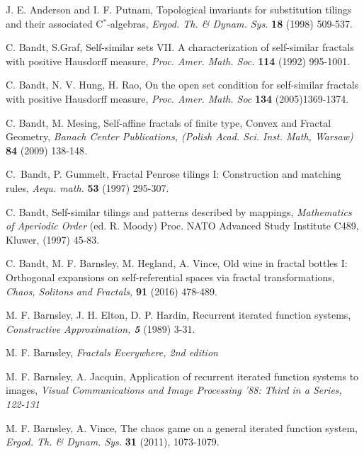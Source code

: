 \documentclass{amsproc}
\theoremstyle{plain}
\theoremstyle{definition}
\numberwithin{equation}{section}
\begin{document}
\begin{thebibliography}{99}
 J. E. Anderson and I. F. Putnam, Topological invariants
for substitution tilings and their associated C$^{\ast}$-algebras, \textit{%
Ergod. Th. \& Dynam. Sys. }\textbf{18 }(1998) 509-537.

\begin{newrigid}

C. Bandt, S.Graf, Self-similar sets VII. A
characterization of self-similar fractals with positive Hausdorff measure,
\textit{Proc. Amer. Math. Soc. }\textbf{114} (1992) 995-1001.

C. Bandt, N. V. Hung, H. Rao, On the open set
condition for self-similar fractals with positive Hausdorff measure,
\textit{Proc. Amer. Math. Soc }\textbf{134 }(2005)1369-1374.

C. Bandt, M. Mesing, Self-affine fractals of finite
type, Convex and Fractal Geometry,\textit{ Banach Center Publications, (Polish
Acad. Sci. Inst. Math, Warsaw) }\textbf{84} (2009)\textit{ }138-148\textit{.}

\end{newrigid}

 C.\ Bandt, P. Gummelt, Fractal Penrose tilings I:
Construction and matching rules, \textit{Aequ. math. }\textbf{53} (1997)
295-307.

 C. Bandt, Self-similar tilings and patterns described by
mappings, \textit{Mathematics of Aperiodic Order }(ed. R. Moody) Proc. NATO
Advanced Study Institute C489, Kluwer, (1997) 45-83.

 C. Bandt, M. F. Barnsley, M. Hegland, A. Vince, Old wine in
fractal bottles I: Orthogonal expansions on self-referential spaces via
fractal transformations, \textit{Chaos, Solitons and Fractals, }\textbf{91}
(2016) 478-489.

 M. F. Barnsley, J. H. Elton, D. P. Hardin, Recurrent
iterated function systems, \textit{Constructive Approximation, \textbf{5}}
(1989) 3-31.

 M. F. Barnsley, \textit{Fractals Everywhere, 2nd
edition }

 M. F. Barnsley, A. Jacquin, Application of recurrent
iterated function systems to images, \textit{Visual Communications and Image
Processing '88: Third in a Series, 122-131}

 M. F. Barnsley, A. Vince, The chaos game on a
general iterated function system, \textit{Ergod. Th. \& Dynam. Sys. }\textbf{%
31} (2011), 1073-1079.


\end{thebibliography}
\end{document}
